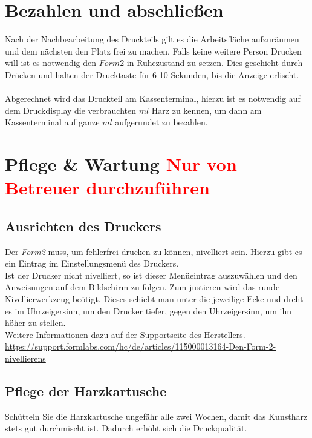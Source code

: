 \documentclass{\basedir/fablab-document}
\begin{document}
	
	\section{Bezahlen und abschließen}
	
	Nach der Nachbearbeitung des Druckteils gilt es die Arbeitsfläche aufzuräumen und dem nächsten den Platz frei zu machen. Falls keine weitere Person Drucken will ist es notwendig den $Form2$ in Ruhezustand zu setzen. Dies geschieht durch Drücken und halten der Drucktaste für 6-10 Sekunden, bis die Anzeige erlischt. \\ 
	\\
	Abgerechnet wird das Druckteil am Kassenterminal, hierzu ist es notwendig auf dem Druckdisplay die verbrauchten $ml$ Harz zu kennen, um dann am Kassenterminal auf ganze $ml$ aufgerundet zu bezahlen.
	\pagebreak
	

	\section{Pflege \& Wartung \textcolor{red}{Nur von Betreuer durchzuführen}}
	
	\subsection{Ausrichten des Druckers}
	Der \textit{Form2} muss, um fehlerfrei drucken zu können, nivelliert sein. Hierzu gibt es ein Eintrag im Einstellungsmenü des Druckers.\\
	Ist der Drucker nicht nivelliert, so ist dieser Menüeintrag auszuwählen und den Anweisungen auf dem Bildschirm zu folgen. Zum justieren wird das runde Nivellierwerkzeug beötigt. Dieses schiebt man unter die jeweilige Ecke und dreht es im Uhrzeigersinn, um den Drucker tiefer, gegen den Uhrzeigersinn, um ihn höher zu stellen.\\
	Weitere Informationen dazu auf der Supportseite des Herstellers.	\\
	 \url{https://support.formlabs.com/hc/de/articles/115000013164-Den-Form-2-nivellierens}
	 
	 \subsection{Pflege der Harzkartusche}
	 Schütteln Sie die Harzkartusche ungefähr alle zwei Wochen, damit das Kunstharz stets gut durchmischt ist. Dadurch erhöht sich die Druckqualität.
	
\end{document}
